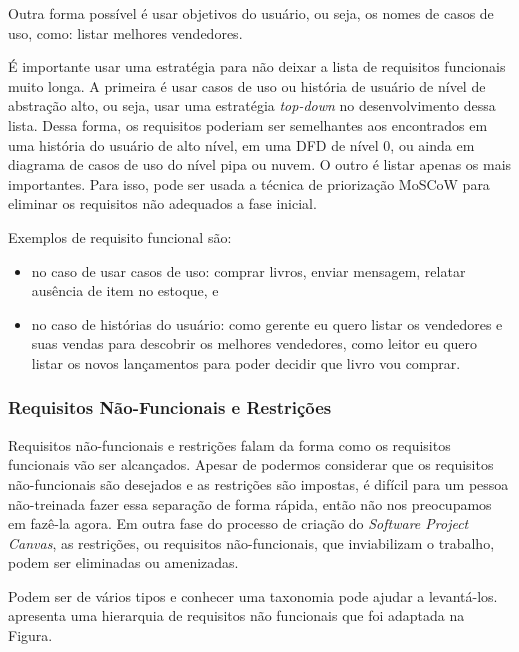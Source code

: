 \documentclass[a4]{report}
\begin{document}
Outra forma possível é usar objetivos do usuário, ou seja, os nomes de casos de uso, como: listar melhores vendedores\citep{Cockburn2000}.

É importante usar uma estratégia para não deixar a lista de requisitos funcionais muito longa. A primeira é usar casos de uso ou história de usuário de nível de abstração alto, ou seja, usar uma estratégia \textit{top-down} no desenvolvimento dessa lista. Dessa forma, os requisitos poderiam ser semelhantes aos encontrados em uma história do usuário de alto nível\citep{jacobson:2011:uc2p0}, em uma DFD de nível 0\citep{gane:sarson:ssa}, ou ainda em diagrama de casos de uso do nível pipa ou nuvem\citep{Cockburn2000}. O outro é listar apenas os mais importantes. Para isso, pode ser usada a técnica de priorização MoSCoW\citep{babok,dsdm:2nd} para eliminar os requisitos não adequados a fase inicial.

Exemplos de requisito funcional são:
\begin{itemize}
    \item no caso de usar casos de uso: comprar livros, enviar mensagem, relatar ausência de item no estoque, e
    \item no caso de histórias do usuário: como gerente eu quero listar os vendedores e suas vendas para descobrir os melhores vendedores, como leitor eu quero listar os novos lançamentos para poder decidir que livro vou comprar.
\end{itemize}

\subsubsection{Requisitos Não-Funcionais e Restrições}

Requisitos não-funcionais e restrições falam da forma como os requisitos funcionais vão ser alcançados. Apesar de podermos considerar que os requisitos não-funcionais são desejados e as restrições são impostas, é difícil para um pessoa não-treinada fazer essa separação de forma rápida, então não nos preocupamos em fazê-la agora. Em outra fase do processo de criação do \textit{Software Project Canvas}, as restrições, ou requisitos não-funcionais, que inviabilizam o trabalho, podem ser eliminadas ou amenizadas.

Podem ser de vários tipos e conhecer uma taxonomia pode ajudar a levantá-los. \citet{sommerville:software:2015} apresenta uma hierarquia de requisitos não funcionais que foi adaptada na Figura.
\end{document}
